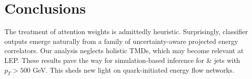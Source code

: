 \section{Conclusions}\label{sec:conclusions}

The treatment of attention weights is admittedly heuristic.
Surprisingly, classifier outputs emerge naturally from a family of
uncertainty-aware projected energy correlators. Our analysis neglects
holistic TMDs, which may become relevant at LEP. These results pave the
way for simulation-based inference for & jets with $p_T > 500$ GeV. This
sheds new light on quark-initiated energy flow networks.

